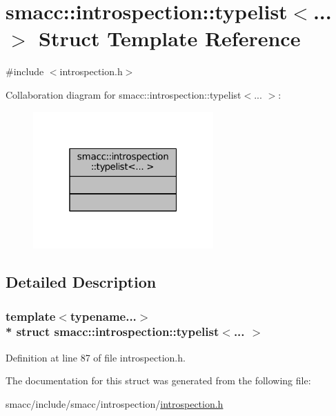 \hypertarget{structsmacc_1_1introspection_1_1typelist}{}\section{smacc\+:\+:introspection\+:\+:typelist$<$... $>$ Struct Template Reference}
\label{structsmacc_1_1introspection_1_1typelist}


{\ttfamily \#include $<$introspection.\+h$>$}



Collaboration diagram for smacc\+:\+:introspection\+:\+:typelist$<$... $>$\+:
\nopagebreak
\begin{figure}[H]
\begin{center}
\leavevmode
\includegraphics[width=196pt]{structsmacc_1_1introspection_1_1typelist__coll__graph}
\end{center}
\end{figure}


\subsection{Detailed Description}
\subsubsection*{template$<$typename...$>$\\*
struct smacc\+::introspection\+::typelist$<$... $>$}



Definition at line 87 of file introspection.\+h.



The documentation for this struct was generated from the following file\+:\begin{DoxyCompactItemize}
\item 
smacc/include/smacc/introspection/\hyperlink{introspection_8h}{introspection.\+h}\end{DoxyCompactItemize}

